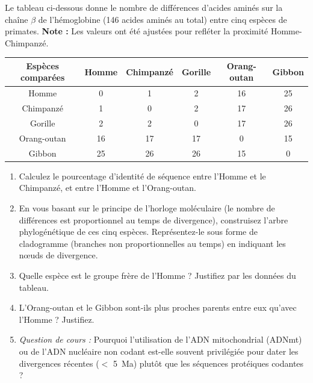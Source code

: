 \documentclass[11pt]{article}
\begin{document}
\begin{exercice}
Le tableau ci-dessous donne le nombre de différences d'acides aminés sur la chaîne $\beta$ de l'hémoglobine (146 acides aminés au total) entre cinq espèces de primates. \textbf{Note :} Les valeurs ont été ajustées pour refléter la proximité Homme-Chimpanzé.

\begin{center}
\begin{tabular}{|c|ccccc|}\hline
\textbf{Espèces comparées} & \textbf{Homme} & \textbf{Chimpanzé} & \textbf{Gorille} & \textbf{Orang-outan} & \textbf{Gibbon} \\ \hline
Homme & 0 & 1 & 2 & 16 & 25 \\
Chimpanzé & 1 & 0 & 2 & 17 & 26 \\
Gorille & 2 & 2 & 0 & 17 & 26 \\
Orang-outan & 16 & 17 & 17 & 0 & 15 \\
Gibbon & 25 & 26 & 26 & 15 & 0 \\ \hline
\end{tabular}
\end{center}

\begin{enumerate}
    \item Calculez le pourcentage d'identité de séquence entre l'Homme et le Chimpanzé, et entre l'Homme et l'Orang-outan.
    \item En vous basant sur le principe de l'horloge moléculaire (le nombre de différences est proportionnel au temps de divergence), construisez l'arbre phylogénétique de ces cinq espèces. Représentez-le sous forme de cladogramme (branches non proportionnelles au temps) en indiquant les nœuds de divergence.
    \item Quelle espèce est le groupe frère de l'Homme ? Justifiez par les données du tableau.
    \item L'Orang-outan et le Gibbon sont-ils plus proches parents entre eux qu'avec l'Homme ? Justifiez.
    \item \emph{Question de cours :} Pourquoi l'utilisation de l'ADN mitochondrial (ADNmt) ou de l'ADN nucléaire non codant est-elle souvent privilégiée pour dater les divergences récentes ($<$ \SI{5}{Ma}) plutôt que les séquences protéiques codantes ?
\end{enumerate}
\end{exercice}
\end{document}
